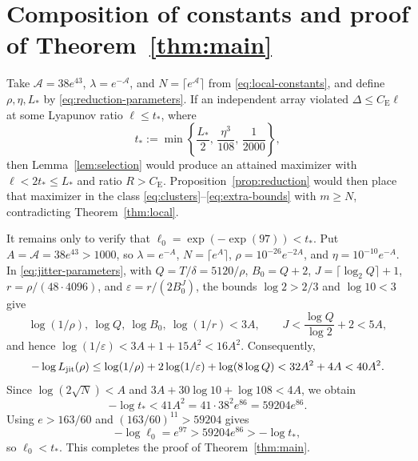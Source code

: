 \documentclass[11pt]{article}
\numberwithin{equation}{section}
\theoremstyle{remark}
\newcommand{\eps}{\varepsilon}
\newcommand{\be}{C_{\mathrm E}}
\begin{document}


\section{Composition of constants and proof of Theorem~\ref{thm:main}}\label{sec:completion}

Take $\mathcal A=38e^{43}$, $\lambda=e^{-\mathcal A}$, and $N=\lceil e^{\mathcal A}\rceil$
from \eqref{eq:local-constants}, and define $\rho,\eta,L_*$ by
\eqref{eq:reduction-parameters}. If an independent array violated
$\Delta\le\be\ell$ at some Lyapunov ratio $\ell\le t_*$, where
\begin{equation}\label{eq:tstar}
             t_*:=\min\left\{\frac{L_*}2,\,\frac{\eta^3}{108},\,\frac1{2000}\right\},
\end{equation}
then Lemma~\ref{lem:selection} would produce an attained maximizer with
$\ell<2t_*\le L_*$ and ratio $R>\be$. Proposition~\ref{prop:reduction} would
then place that maximizer in the class \eqref{eq:clusters}--\eqref{eq:extra-bounds}
with $m\ge N$, contradicting Theorem~\ref{thm:local}.

It remains only to verify that $\ell_0=\exp(-\exp(97))<t_*$. Put
$A=\mathcal A=38e^{43}>1000$, so $\lambda=e^{-A}$, $N=\lceil e^A\rceil$,
$\rho=10^{-26}e^{-2A}$, and $\eta=10^{-10}e^{-A}$. In \eqref{eq:jitter-parameters},
with $Q=T/\delta=5120/\rho$, $B_0=Q+2$, $J=\lceil\log_2Q\rceil+1$,
$r=\rho/(48\cdot4096)$, and $\eps=r/(2B_0^J)$, the bounds $\log2>2/3$ and
$\log10<3$ give
\[
 \log(1/\rho),\ \log Q,\ \log B_0,\ \log(1/r)<3A,
 \qquad J<\frac{\log Q}{\log2}+2<5A,
\]
and hence $\log(1/\eps)<3A+1+15A^2<16A^2$. Consequently,
\[
 -\log L_{\rm jit}(\rho)
 \le\log(1/\rho)+2\log(1/\eps)+\log(8\log Q)
 <32A^2+4A<40A^2.
\]
Since $\log(2\sqrt N)<A$ and $3A+30\log10+\log108<4A$, we obtain
\[
 -\log t_*<41A^2=41\cdot38^2e^{86}=59204e^{86}.
\]
Using $e>163/60$ and $(163/60)^{11}>59204$ gives
\[
 -\log\ell_0=e^{97}>59204e^{86}>-\log t_*,
\]
so $\ell_0<t_*$. This completes the proof of Theorem~\ref{thm:main}.

\appendix





\end{document}
